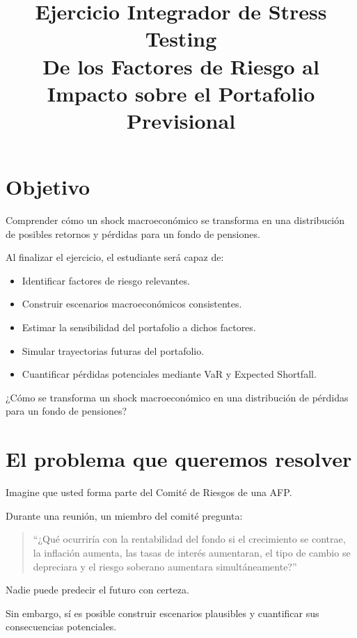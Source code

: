 \documentclass[11pt]{article}
\title{\textbf{Ejercicio Integrador de Stress Testing}\\
\vspace{0.3cm}
\large De los Factores de Riesgo al Impacto sobre el Portafolio Previsional}
\author{}
\date{}
\begin{document}
\maketitle


\section*{Objetivo}

Comprender cómo un shock macroeconómico se transforma en una distribución de posibles retornos y pérdidas para un fondo de pensiones.

Al finalizar el ejercicio, el estudiante será capaz de:

\begin{itemize}
\item Identificar factores de riesgo relevantes.
\item Construir escenarios macroeconómicos consistentes.
\item Estimar la sensibilidad del portafolio a dichos factores.
\item Simular trayectorias futuras del portafolio.
\item Cuantificar pérdidas potenciales mediante VaR y Expected Shortfall.
\end{itemize}

\begin{tcolorbox}[colback=blue!5,colframe=blue!50!black,title=Pregunta central]
¿Cómo se transforma un shock macroeconómico en una distribución de pérdidas para un fondo de pensiones?
\end{tcolorbox}

\section{El problema que queremos resolver}

Imagine que usted forma parte del Comité de Riesgos de una AFP.

Durante una reunión, un miembro del comité pregunta:

\begin{quote}
``¿Qué ocurriría con la rentabilidad del fondo si el crecimiento se contrae, la inflación aumenta, las tasas de interés aumentaran, el tipo de cambio se depreciara y el riesgo soberano aumentara simultáneamente?''
\end{quote}

Nadie puede predecir el futuro con certeza.

Sin embargo, sí es posible construir escenarios plausibles y cuantificar sus consecuencias potenciales.
\end{document}
